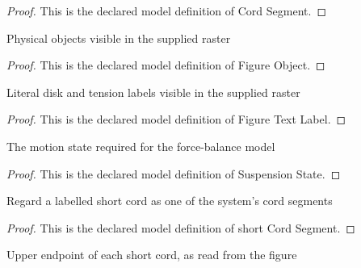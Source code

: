 \begin{proof}
  This is the declared model definition of Cord Segment.
\end{proof}
\begin{definition}
  \label{def:physics:phyx-mini-0757:phyxminiproblems-problemphyxmini0757-figureobject}
  Physical objects visible in the supplied raster
\end{definition}
\begin{proof}
  This is the declared model definition of Figure Object.
\end{proof}
\begin{definition}
  \label{def:physics:phyx-mini-0757:phyxminiproblems-problemphyxmini0757-figuretextlabel}
  Literal disk and tension labels visible in the supplied raster
\end{definition}
\begin{proof}
  This is the declared model definition of Figure Text Label.
\end{proof}
\begin{definition}
  \label{def:physics:phyx-mini-0757:phyxminiproblems-problemphyxmini0757-suspensionstate}
  The motion state required for the force-balance model
\end{definition}
\begin{proof}
  This is the declared model definition of Suspension State.
\end{proof}
\begin{definition}
  \label{def:physics:phyx-mini-0757:phyxminiproblems-problemphyxmini0757-shortcordsegment}
  Regard a labelled short cord as one of the system's cord segments
\end{definition}
\begin{proof}
  This is the declared model definition of short Cord Segment.
\end{proof}
\begin{definition}
  \label{def:physics:phyx-mini-0757:phyxminiproblems-problemphyxmini0757-expectedupperdisk}
  Upper endpoint of each short cord, as read from the figure
\end{definition}
